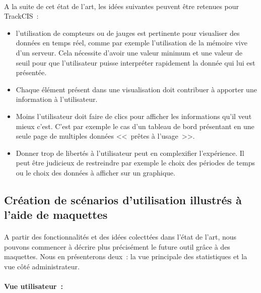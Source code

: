 			\paragraph{}
			A la suite de cet état de l'art, les idées suivantes peuvent être retenues
			pour TrackCIS~:
			\begin{itemize}
			  \item l'utilisation de compteurs ou de jauges est pertinente pour
			  visualiser des données en temps réel, comme par exemple l'utilisation de
			  la mémoire vive d'un serveur. Cela nécessite d'avoir une valeur minimum et
			  une valeur de seuil pour que l'utilisateur puisse interpréter rapidement la
			  donnée qui lui est présentée.
			  \item Chaque élément présent dans une visualisation doit contribuer à
			  apporter une information à l'utilisateur.
			  \item Moins l'utilisateur doit faire de clics pour afficher les
			  informations qu'il veut mieux c'est. C'est par exemple le cas d'un tableau
			  de bord présentant en une seule page de multiples données <<~prêtes à
			  l'usage~>>.
			  \item Donner trop de libertés à l'utilisateur peut en complexifier
			  l'expérience. Il peut être judicieux de restreindre par exemple le choix
			  des périodes de temps ou le choix des données à afficher sur un graphique.
			\end{itemize}
			
		\subsection{Création de scénarios d'utilisation illustrés à l'aide de
		maquettes}
			\paragraph{}
			A partir des fonctionnalités et des idées colecttées dans l'état de l'art,
			nous pouvons commencer à décrire plus précisément le future outil grâce à des
			maquettes. Nous en présenterons deux~: la vue principale des statistiques et
			la vue côté administrateur.
			
			\paragraph{Vue utilisateur~:}
			

